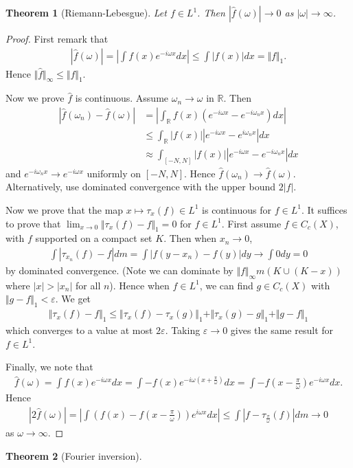 \documentclass[11pt]{amsart}
\newtheorem{theorem}{Theorem}[section]
\theoremstyle{definition}
\numberwithin{equation}{section}
\begin{document}
\begin{theorem}[Riemann-Lebesgue]
    Let $f\in L^1$. Then $|\hat f(\omega)|\to 0$ as $|\omega|\to\infty$.
\end{theorem}
\begin{proof}
    First remark that
    \begin{align*}
        |\hat f(\omega)|=\left|\int f(x)e^{-i\omega x}dx\right|\le\int|f(x)|dx=\Vert f\Vert_1.
    \end{align*}
    Hence $\Vert\hat f\Vert_\infty\le\Vert f\Vert_1$.

    Now we prove $\hat f$ is continuous. Assume $\omega_n\to \omega$ in $\mathbb R$. Then
    \begin{align*}
        |\hat f(\omega_n)-\hat f(\omega)|&=\left|\int_\mathbb R f(x)(e^{-i\omega x}-e^{-i\omega_nx})dx\right|\\
        &\le\int_\mathbb R|f(x)||e^{-i\omega x}-e^{i\omega_nx}|dx\\
        &\approx \int_{[-N,N]}|f(x)||e^{-i\omega x}-e^{-i\omega_nx}|dx
    \end{align*}
    and $e^{-i\omega_nx}\to e^{-i\omega x}$ uniformly on $[-N,N]$. Hence $\hat f(\omega_n)\to \hat f(\omega)$. Alternatively, use dominated convergence with the upper bound $2|f|$.

    Now we prove that the map $x\mapsto \tau_x(f)\in L^1$ is continuous for $f\in L^1$. It suffices to prove that $\lim_{x\to 0}\Vert \tau_x(f)-f\Vert_1=0$ for $f\in L^1$. First assume $f\in C_c(X)$, with $f$ supported on a compact set $K$. Then when $x_n\to 0$,
    \begin{align*}
        \int|\tau_{x_n}(f)-f|dm=\int |f(y-x_n)-f(y)|dy\to\int 0dy=0
    \end{align*}
    by dominated convergence. (Note we can dominate by $\Vert f\Vert_\infty m(K\cup(K-x))$ where $|x|>|x_n|$ for all $n$). Hence when $f\in L^1$, we can find $g\in C_c(X)$ with $\Vert g-f\Vert_1<\varepsilon$. We get
    \begin{align*}
        \Vert\tau_x(f)-f\Vert_1\le\Vert\tau_x(f)-\tau_x(g)\Vert_1+\Vert\tau_x(g)-g\Vert_1+\Vert g-f\Vert_1
    \end{align*}
    which converges to a value at most $2\varepsilon$. Taking $\varepsilon\to 0$ gives the same result for $f\in L^1$.

    Finally, we note that
    \begin{align*}
        \hat f(\omega)=\int f(x)e^{-i\omega x}dx=\int -f(x)e^{-i\omega(x+\frac{\pi}{\omega})}dx=\int -f(x-\frac{\pi}{\omega})e^{-i\omega x}dx.
    \end{align*}
    Hence
    \begin{align*}
        |2\hat f(\omega)|=\left|\int (f(x)-f(x-\frac{\pi}{\omega}))e^{i\omega x}dx\right|\le\int |f-\tau_{\frac{\pi}{\omega}}(f)|dm\to 0
    \end{align*}
    as $\omega\to\infty$.
\end{proof}
\begin{theorem}[Fourier inversion]
    
\end{theorem}
\end{document}
